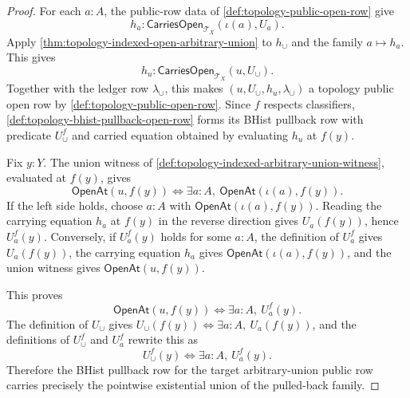 \begin{proof}
For each $a:A$, the public-row data of \autoref{def:topology-public-open-row} give
$$
h_a:\mathsf{CarriesOpen}_{\mathcal{T}_X}(\iota(a),U_a).
$$
Apply \autoref{thm:topology-indexed-open-arbitrary-union} to $h_{\cup}$ and the family $a\mapsto h_a$. This gives
$$
h_u:\mathsf{CarriesOpen}_{\mathcal{T}_X}(u,U_{\cup}).
$$
Together with the ledger row $\lambda_{\cup}$, this makes $(u,U_{\cup},h_u,\lambda_{\cup})$ a topology public open row by \autoref{def:topology-public-open-row}. Since $f$ respects classifiers, \autoref{def:topology-bhist-pullback-open-row} forms its BHist pullback row with predicate $U_{\cup}^{f}$ and carried equation obtained by evaluating $h_u$ at $f(y)$.

Fix $y:Y$. The union witness of \autoref{def:topology-indexed-arbitrary-union-witness}, evaluated at $f(y)$, gives
$$
\mathsf{OpenAt}(u,f(y))
\Longleftrightarrow
\exists a:A,\ \mathsf{OpenAt}(\iota(a),f(y)).
$$
If the left side holds, choose $a:A$ with $\mathsf{OpenAt}(\iota(a),f(y))$. Reading the carrying equation $h_a$ at $f(y)$ in the reverse direction gives $U_a(f(y))$, hence $U_a^{f}(y)$. Conversely, if $U_a^{f}(y)$ holds for some $a:A$, the definition of $U_a^{f}$ gives $U_a(f(y))$, the carrying equation $h_a$ gives $\mathsf{OpenAt}(\iota(a),f(y))$, and the union witness gives $\mathsf{OpenAt}(u,f(y))$.

This proves
$$
\mathsf{OpenAt}(u,f(y))
\Longleftrightarrow
\exists a:A,\ U_a^{f}(y).
$$
The definition of $U_{\cup}$ gives $U_{\cup}(f(y))\Longleftrightarrow \exists a:A,\ U_a(f(y))$, and the definitions of $U_{\cup}^{f}$ and $U_a^{f}$ rewrite this as
$$
U_{\cup}^{f}(y)
\Longleftrightarrow
\exists a:A,\ U_a^{f}(y).
$$
Therefore the BHist pullback row for the target arbitrary-union public row carries precisely the pointwise existential union of the pulled-back family.
\end{proof}
